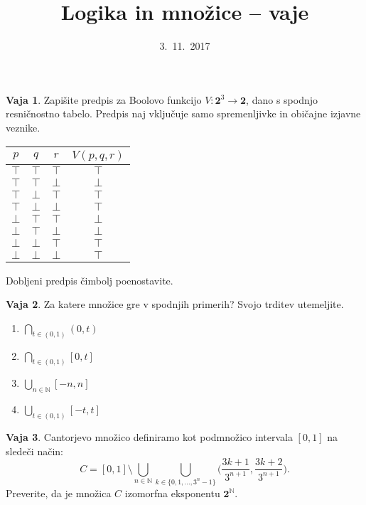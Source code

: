 \documentclass{article}
\newcommand{\lthen}{\Rightarrow}
\newcommand{\two}{\mathbf{2}}
\newcommand{\true}{\top}
\newcommand{\false}{\bot}
\newcommand{\NN}{\mathbb{N}}
\theoremstyle{definition}
\newtheorem{vaja}{Vaja}
\begin{document}
\title{Logika in množice -- vaje}
\date{3.~11.~2017}
\maketitle

\begin{vaja}
  Zapišite predpis za Boolovo funkcijo $V\colon \two^3 \to \two$, dano s spodnjo res\-ni\-čno\-stno tabelo. Predpis naj vključuje samo spremenljivke in običajne izjavne veznike.
  \smallskip
  \begin{center}
    \begin{tabular}{ccc|c}
      $p$ & $q$ & $r$ & $V(p, q, r)$ \\
      \hline
      $\true$ & $\true$ & $\true$ & $\true$  \\
      $\true$ & $\true$ & $\false$ & $\false$  \\
      $\true$ & $\false$ & $\true$ & $\true$  \\
      $\true$ & $\false$ & $\false$ & $\true$  \\
      $\false$ & $\true$ & $\true$ & $\false$  \\
      $\false$ & $\true$ & $\false$ & $\false$  \\
      $\false$ & $\false$ & $\true$ & $\true$  \\
      $\false$ & $\false$ & $\false$ & $\true$  \\
    \end{tabular}
  \end{center}
  \smallskip
  Dobljeni predpis čimbolj poenostavite.
\end{vaja}

\begin{vaja}
  Za katere množice gre v spodnjih primerih? Svojo trditev utemeljite.
  \begin{enumerate}
    \item
      $\displaystyle{\bigcap_{t \in (0, 1)} (0, t)}$
    \item
      $\displaystyle{\bigcap_{t \in (0, 1)} [0, t]}$
    \item
      $\displaystyle{\bigcup_{n \in \NN} [-n, n]}$
    \item
      $\displaystyle{\bigcup_{t \in (0, 1)} [-t, t]}$
  \end{enumerate}
\end{vaja}

\begin{vaja}
  Cantorjevo množico definiramo kot podmnožico intervala $[0, 1]$ na sledeči način:
  \[C = [0, 1] \setminus \bigcup_{n \in \NN} \bigcup_{k \in \{0, 1,\ldots, 3^n - 1\}} \Big(\frac{3k+1}{3^{n+1}}, \frac{3k+2}{3^{n+1}}\Big).\]
  Preverite, da je množica $C$ izomorfna eksponentu $\two^\NN$.
\end{vaja}
\end{document}

